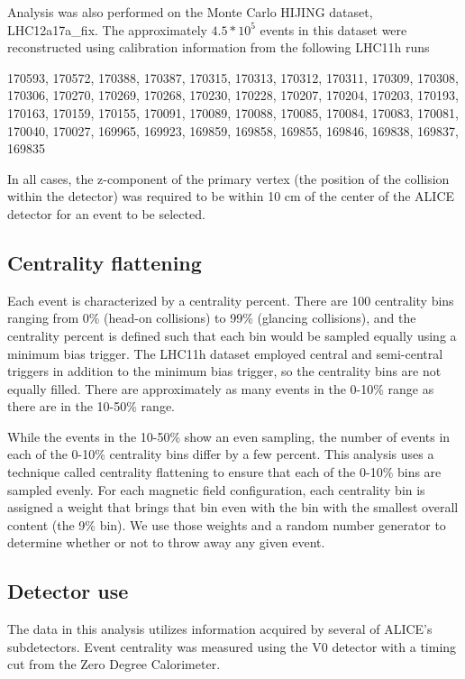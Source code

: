 Analysis was also performed on the Monte Carlo HIJING dataset, LHC12a17a\_fix.
The approximately $4.5*10^5$ events in this dataset were reconstructed using calibration information from the following LHC11h runs

170593, 170572, 170388, 170387, 170315, 170313, 170312, 170311, 170309, 170308, 170306, 170270, 170269, 170268, 170230, 170228, 170207, 170204, 170203, 170193, 170163, 170159, 170155, 170091, 170089, 170088, 170085, 170084, 170083, 170081, 170040, 170027, 169965, 169923, 169859, 169858, 169855, 169846, 169838, 169837, 169835

In all cases, the z-component of the primary vertex (the position of the collision within the detector) was required to be within 10 cm of the center of the ALICE detector for an event to be selected.  

\subsection{Centrality flattening}
\label{sec:CentralityFlattening}

Each event is characterized by a centrality percent.
There are 100 centrality bins ranging from 0\%  (head-on collisions) to 99\% (glancing collisions), and the centrality percent is defined such that each bin would be sampled equally using a minimum bias trigger.
The LHC11h dataset employed central and semi-central triggers in addition to the minimum bias trigger, so the centrality bins are not equally filled.
There are approximately as many events in the 0-10\% range as there are in the 10-50\% range.

While the events in the 10-50\% show an even sampling, the number of events in each of the 0-10\% centrality bins differ by a few percent.
This analysis uses a technique called centrality flattening to ensure that each of the 0-10\% bins are sampled evenly.
For each magnetic field configuration, each centrality bin is assigned a weight that brings that bin even with the bin with the smallest overall content (the 9\% bin).
We use those weights and a random number generator to determine whether or not to throw away any given event.

\subsection{Detector use}
The data in this analysis utilizes information acquired by several of ALICE's subdetectors.  
Event centrality was measured using the V0 detector with a timing cut from the Zero Degree Calorimeter. 

